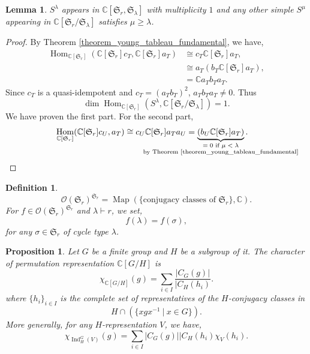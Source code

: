 \documentclass{article}
\newtheorem{proposition}{Proposition}[section]
\newtheorem{definition}{Definition}[section]
\newtheorem{lemma}{Lemma}[section]
\numberwithin{equation}{theorem}
\DeclareMathOperator{\Map}{Map}
\DeclareMathOperator{\Ind}{Ind}
\DeclareMathOperator{\Hom}{Hom}
\newcommand{\Ouv}[0]{\mathcal{O}}
\newcommand{\C}[0]{\mathbb{C}}
\newcommand{\sep}[0]{\:|\:}
\newcommand{\fS}[0]{\mathfrak{S}}
\begin{document}
\begin{lemma}
    $S^\lambda$ appears in $\C[\fS_r,\fS_\lambda]$ with multiplicity $1$ and any other simple $S^\mu$ appearing in $\C[\fS_r/\fS_\lambda]$ satisfies $\mu\geq\lambda$.
\end{lemma}
\begin{proof}
By Theorem \ref{theorem_young_tableau_fundamental}, we have,
\begin{align*}
    \Hom_{\C[\fS_r]}(\C[\fS_r]c_T,\C[\fS_r]a_T) & \cong c_T\C[\fS_r]a_T,\\
    & \cong a_T(b_T\C[\fS_r]a_T),\\
    & = \C a_Tb_Ta_T.
\end{align*}
Since $c_T$ is a quasi-idempotent and $c_T=(a_Tb_T)^2$, $a_Tb_Ta_T\not=0$. Thus 
\begin{equation*}
    \dim\Hom_{\C[\fS_r]}(S^\lambda,\C[\fS_r/\fS_\lambda])=1.
\end{equation*}
We have proven the first part. For the second part, 
\begin{align*}
    \Hom_{\C[\fS_r]}(\C[\fS_r]c_U,a_T) & \cong c_U\C[\fS_r]a_T a_U=\underbrace{(b_U\C[\fS_r]a_T)}_{\substack{\text{\makebox[0pt][c]{$=0$ if $\mu<\lambda$}}\\\text{\makebox[0pt][c]{by Theorem \ref{theorem_young_tableau_fundamental}}}}}.
\end{align*}
\end{proof}
\begin{definition}
    \begin{equation*}
        \Ouv(\fS_r)^{\fS_r} = \Map(\{\text{conjugacy classes of $\fS_r$}\},\C).
    \end{equation*}
    For $f\in\Ouv(\fS_r)^{\fS_r}$ and $\lambda\vdash r$, we set,
    \begin{equation*}
        f(\lambda) = f(\sigma),
    \end{equation*}
    for any $\sigma\in\fS_r$ of cycle type $\lambda$.
\end{definition}
\begin{proposition}
    Let $G$ be a finite group and $H$ be a subgroup of it. The character of permutation representation $\C[G/H]$ is 
    \begin{equation*}
        \chi_{\C[G/H]}(g) = \sum_{i\in I}{\frac {\vert C_G(g)\vert}{\vert C_H(h_i)}}.
    \end{equation*}
    where $\{h_i\}_{i\in I}$ is the complete set of representatives of the $H$-conjugacy classes in 
    \begin{equation*}
        H\cap (\{xgx^{-1}\sep x\in G\}).
    \end{equation*}
    More generally, for any $H$-representation $V$, we have,
    \begin{equation*}
        \chi_{\Ind_H^G(V)}(g) = \sum_{i\in I}{{\vert C_G(g)\vert}{\vert C_H(h_i)}}\chi_V(h_i).
    \end{equation*}
\end{proposition}
\end{document}
